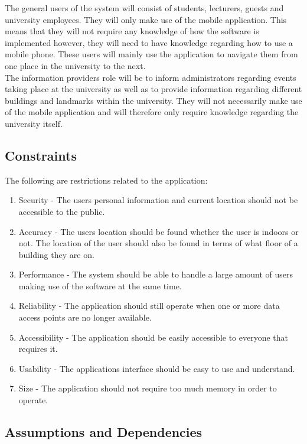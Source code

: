 \documentclass[12pt,a4paper]{report}
\begin{document}
	The general users of the system will consist of students, lecturers, guests and university employees. They will only make use of the mobile application. This means that they will not require any knowledge of how the software is implemented however, they will need to have knowledge regarding how to use a mobile phone. These users will mainly use the application to navigate them from one place in the university to the next.
	\\

	The information providers role will be to inform administrators regarding events taking place at the university as well as to provide information regarding different buildings and landmarks within the university. They will not necessarily make use of the mobile application and will therefore only require knowledge regarding the university itself.
	
	\subsection*{Constraints}
	The following are restrictions related to the application:
		\begin{enumerate}
				\renewcommand{\labelenumi}{{\textbf{\arabic{enumi}.}}}
				\item Security  - The users personal information and current location should not be accessible to the public.
				\item Accuracy - The users location should be found whether the user is indoors or not. The location of the user should also be found in terms of what floor of a building they are on.
				\item Performance - The system should be able to handle a large amount of users making use of the software at the same time.
				\item Reliability - The application should still operate when one or more data access points are no longer available.
				\item Accessibility - The application should be easily accessible to everyone that requires it.
				\item Usability - The applications interface should be easy to use and understand.
				\item Size - The application should not require too much memory in order to operate.
				\end{enumerate}
	\subsection*{Assumptions and Dependencies}
\end{document}
